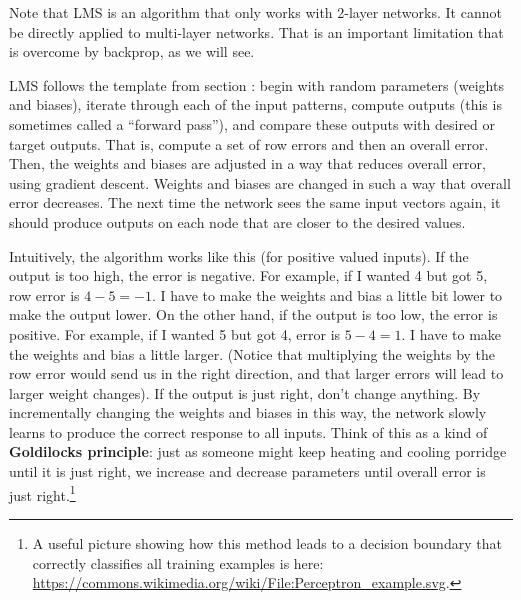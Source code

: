 Note that LMS is an algorithm that only works with 2-layer networks. It cannot be directly applied to multi-layer networks. That is an important limitation that is overcome by backprop, as we will see.

LMS follows the template from section :  begin with  random parameters (weights and biases), iterate through each of the input patterns, compute outputs (this is sometimes called a ``forward pass''), and compare these outputs with desired or target outputs. That is, compute a set of row errors and then an overall error. Then, the weights and biases are adjusted in a way that reduces overall error, using gradient descent.  Weights and biases are changed in such a way that overall error decreases. The next time the network sees the same input vectors again, it should produce outputs on each node that are closer to the desired values.

Intuitively, the algorithm works like this (for positive valued inputs). If the output is too high, the error is negative. For example, if I wanted 4 but got 5, row error is $4-5 = -1$. I have to make the weights and bias a little bit lower to make the output lower. On the other hand, if the output is too low, the error is positive. For example, if I wanted 5 but got 4, error is $5-4 = 1$. I have to make the weights and bias a little larger. (Notice that multiplying the weights by the row error would send us in the right direction, and that larger errors will lead to larger weight changes). If the output is just right, don't change anything. By incrementally changing the weights and biases in this way, the network slowly learns to produce the correct response to all inputs. Think of this as a kind of {\bf Goldilocks principle}: just as someone might keep heating and cooling porridge until it is just right, we increase and decrease parameters until overall error is just right.\footnote{A useful picture showing how this method leads to a decision boundary that correctly classifies all training examples is here: \url{https://commons.wikimedia.org/wiki/File:Perceptron_example.svg}.}
 
